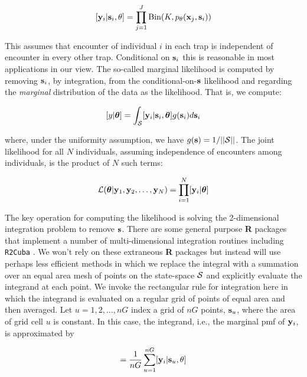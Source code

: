 \documentclass[12pt]{article}
\begin{document}
\begin{spacing}{1.8}
\[
  [{\bf y}_{i} | {\bf s}_{i} , \theta] =
  \prod_{j=1}^{J} \mbox{Bin}(K, p_{\theta}({\bf x}_{j},{\bf s}_{i}) )
\]

{\flushleft This} assumes that encounter of individual $i$ in each
trap is independent of encounter in every other trap. Conditional on
${\bf s}_{i}$ this is reasonable in most applications in our view.
 The so-called marginal likelihood is computed by removing
${\bf s}_{i}$, by integration,  from the conditional-on-${\bf s}$
likelihood and regarding the {\it marginal} distribution of the data
as the likelihood. That
is, we compute:

\[
  [y|{\bm \theta}] =
\int_{{\cal S}}  [ {\bf y}_{i} |{\bf s}_{i},{\bm \theta}] g({\bf s}_{i}) d{\bf s}_{i}
\]

{\flushleft where}, under the uniformity assumption, we have
$g({\bf s}) = 1/||{\cal S}||$.
The joint likelihood for all $N$ individuals, assuming independence of
encounters among individuals, is the product of $N$ such terms:

\[
{\cal L}({\bm \theta} | {\bf y}_{1},{\bf y}_{2},\ldots, {\bf y}_{N}) = \prod_{i=1}^{N}
[{\bf y}_{i}|{\bm \theta}]
\]

The key operation for computing the likelihood is solving the
2-dimensional integration problem to remove ${\bf s}$. There are some
general purpose {\bf R} packages that implement a number of
multi-dimensional integration routines including 
\mbox{\tt R2Cuba} \citep{hahn_etal:2011}.
We won't rely on these extraneous {\bf R} packages but instead will
use perhaps less efficient methods in which we replace the integral
with a summation over an equal area mesh of points on the state-space
${\cal S}$ and explicitly evaluate the integrand at each point. We
invoke the rectangular rule for integration here in which the
integrand is evaluated on a regular grid of points of equal area and
then averaged.  Let $u=1,2,\ldots,nG$ index a grid of $nG$ points,
${\bf s}_{u}$, where the area of grid cell $u$ is constant.  In this
case, the integrand, i.e., the marginal pmf of ${\bf y}_{i}$, is
approximated by

\begin{equation}
         [{\bf y}_{i}|\theta] = \frac{1}{nG} \sum_{u=1}^{nG}  [ {\bf
            y}_{i} |{\bf s}_u, \theta]
\label{mle.eq.intlik}
\end{equation}


\end{spacing}
\end{document}
